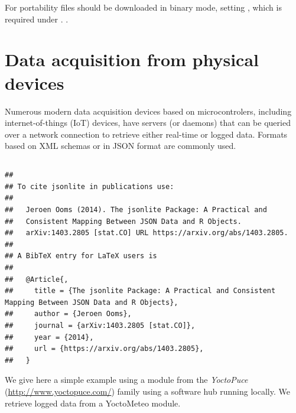 \documentclass[krantz2]{krantz}\usepackage{knitr}%
\newcommand{\href}[2]{\emph{#2} (\url{#1})}
\begin{document}
\begin{warningbox}
For portability  files should be downloaded in binary mode, setting , which is required under .
.
\end{warningbox}

\section{Data acquisition from physical devices}\label{sec:data:acquisition}

Numerous modern data acquisition devices based on microcontrolers, including internet-of-things (IoT) devices, have servers (or daemons) that can be queried over a network connection to retrieve either real-time or logged data. Formats based on XML schemas or in JSON format are commonly used.

\subsection[jsonlite]{}

\begin{knitrout}\footnotesize
{}\color{fgcolor}\begin{kframe}
\begin{alltt}
\hlstd{(} \hlstd{=} \hlstd{)}
\end{alltt}
\begin{verbatim}
## 
## To cite jsonlite in publications use:
## 
##   Jeroen Ooms (2014). The jsonlite Package: A Practical and
##   Consistent Mapping Between JSON Data and R Objects.
##   arXiv:1403.2805 [stat.CO] URL https://arxiv.org/abs/1403.2805.
## 
## A BibTeX entry for LaTeX users is
## 
##   @Article{,
##     title = {The jsonlite Package: A Practical and Consistent Mapping Between JSON Data and R Objects},
##     author = {Jeroen Ooms},
##     journal = {arXiv:1403.2805 [stat.CO]},
##     year = {2014},
##     url = {https://arxiv.org/abs/1403.2805},
##   }
\end{verbatim}
\end{kframe}
\end{knitrout}

We give here a simple example using a module from the \href{http://www.yoctopuce.com/}{YoctoPuce} family using a software hub running locally. We retrieve logged data from a YoctoMeteo module.
\end{document}
